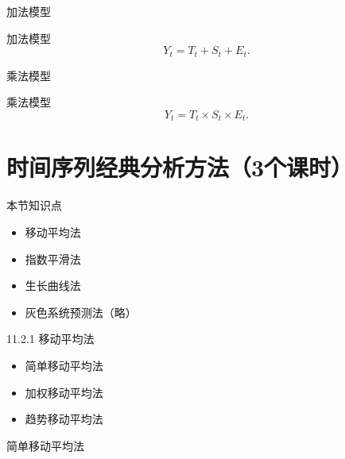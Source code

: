 \documentclass[
  ignorenonframetext,
]{beamer}
\providecommand{\tightlist}{%
  \setlength{\itemsep}{0pt}\setlength{\parskip}{0pt}}
\begin{document}
\begin{frame}{加法模型}
\protect\hypertarget{ux52a0ux6cd5ux6a21ux578b}{}

加法模型 \[
Y_{t} = T_{t} + S_{t} + E_{t}.
\]

\end{frame}

\begin{frame}{乘法模型}
\protect\hypertarget{ux4e58ux6cd5ux6a21ux578b}{}

乘法模型 \[
Y_{t} = T_{t} \times S_{t} \times E_{t}.
\]

\end{frame}

\hypertarget{ux65f6ux95f4ux5e8fux5217ux7ecfux5178ux5206ux6790ux65b9ux6cd53ux4e2aux8bfeux65f6}{%
\section{时间序列经典分析方法（3个课时）}\label{ux65f6ux95f4ux5e8fux5217ux7ecfux5178ux5206ux6790ux65b9ux6cd53ux4e2aux8bfeux65f6}}

\begin{frame}{本节知识点}
\protect\hypertarget{ux672cux8282ux77e5ux8bc6ux70b9-1}{}

\begin{itemize}
\tightlist
\item
  移动平均法
\item
  指数平滑法
\item
  生长曲线法
\item
  灰色系统预测法（略）
\end{itemize}

\end{frame}

\begin{frame}{11.2.1 移动平均法}
\protect\hypertarget{ux79fbux52a8ux5e73ux5747ux6cd5}{}

\begin{itemize}
\tightlist
\item
  简单移动平均法
\item
  加权移动平均法
\item
  趋势移动平均法
\end{itemize}

\end{frame}

\begin{frame}{简单移动平均法}
\protect\hypertarget{ux7b80ux5355ux79fbux52a8ux5e73ux5747ux6cd5}{}

\end{frame}
\end{document}
